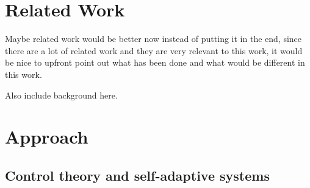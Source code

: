 
\section{Related Work}

Maybe related work would be better now instead of putting it in the end, since there are a lot of related work and they are very relevant to this work, it would be nice to upfront point out what has been done and what would be different in this work.



Also include background here.

\section{Approach}

\subsection{Control theory and self-adaptive systems}

